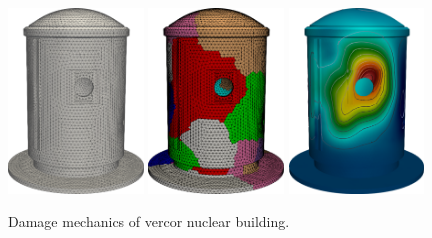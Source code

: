 \begin{figure}
	\centering
	\includegraphics[width=0.32\textwidth]{./Images/vercor-mesh-trans.png}        
	\includegraphics[width=0.32\textwidth]{./Images/vercor-part-trans.png}    
	\includegraphics[width=0.32\textwidth]{./Images/vercor-cont-trans.png}
	\caption{Damage mechanics of vercor nuclear building.}
	\label{fig:vercor-damage}
\end{figure}